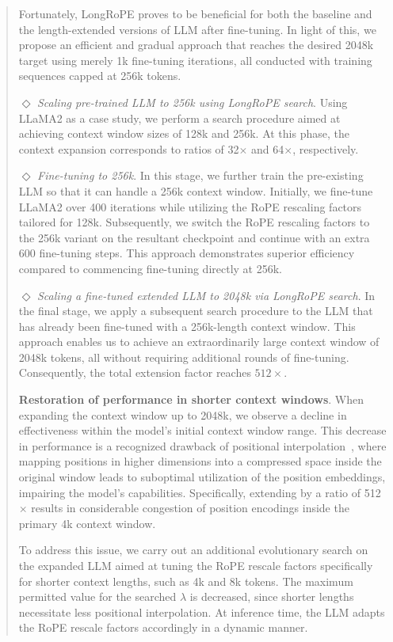 \begin{abstract}
Fortunately, LongRoPE proves to be beneficial for both the baseline and the length-extended versions of LLM after fine-tuning. In light of this, we propose an efficient and gradual approach that reaches the desired 2048k target using merely 1k fine-tuning iterations, all conducted with training sequences capped at 256k tokens.

$\Diamond$ \textit{Scaling pre-trained LLM to 256k using LongRoPE search}. Using LLaMA2 as a case study, we perform a search procedure aimed at achieving context window sizes of 128k and 256k. At this phase, the context expansion corresponds to ratios of 32$\times$ and 64$\times$, respectively.

$\Diamond$ \textit{Fine-tuning to 256k}. In this stage, we further train the pre-existing LLM so that it can handle a 256k context window. Initially, we fine-tune LLaMA2 over 400 iterations while utilizing the RoPE rescaling factors tailored for 128k. Subsequently, we switch the RoPE rescaling factors to the 256k variant on the resultant checkpoint and continue with an extra 600 fine-tuning steps. This approach demonstrates superior efficiency compared to commencing fine-tuning directly at 256k.

$\Diamond$ \textit{Scaling a fine-tuned extended LLM to 2048k via LongRoPE search}. In the final stage, we apply a subsequent search procedure to the LLM that has already been fine-tuned with a 256k-length context window. This approach enables us to achieve an extraordinarily large context window of 2048k tokens, all without requiring additional rounds of fine-tuning. Consequently, the total extension factor reaches $512\times$.

\textbf{Restoration of performance in shorter context windows}. When expanding the context window up to 2048k, we observe a decline in effectiveness within the model’s initial context window range. This decrease in performance is a recognized drawback of positional interpolation~\cite{pi}, where mapping positions in higher dimensions into a compressed space inside the original window leads to suboptimal utilization of the position embeddings, impairing the model's capabilities. Specifically, extending by a ratio of 512$\times$ results in considerable congestion of position encodings inside the primary 4k context window.

To address this issue, we carry out an additional evolutionary search on the expanded LLM aimed at tuning the RoPE rescale factors specifically for shorter context lengths, such as 4k and 8k tokens. The maximum permitted value for the searched $\lambda$ is decreased, since shorter lengths necessitate less positional interpolation. At inference time, the LLM adapts the RoPE rescale factors accordingly in a dynamic manner.


\end{abstract}
